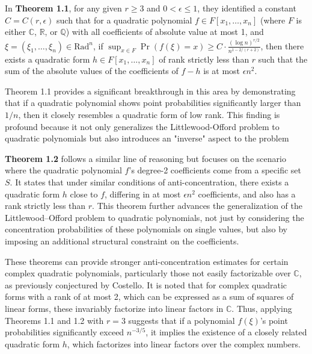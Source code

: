 In \textbf{Theorem 1.1}, for any given $r \geq 3$ and
$0 < \epsilon \leq 1$, they identified a constant
$C = C(r, \epsilon)$ such that for a quadratic polynomial
$f \in F[x_1, \dots, x_n]$ (where $F$ is either 
$\mathbb{C}$, $\mathbb{R}$, or $\mathbb{Q}$) with all coefficients
of absolute value at most 1, and
$\xi = (\xi_1, \dots, \xi_n) \in \text{Rad}^n$, if
${\sup_{x \in F} \Pr(f(\xi) = x) \geq C \cdot \frac{(\log n)^{r/2}}{n^{1-2/(r+2)}}}$,
then there exists a quadratic form
$h \in F[x_1, \dots, x_n]$ of rank strictly less than $r$
such that the sum of the absolute values of the coefficients
of $f - h$ is at most $\epsilon n^2$.
 
Theorem 1.1 provides a significant breakthrough in this 
area by demonstrating that if a quadratic polynomial shows 
point probabilities significantly larger than $1/n$, then
it closely resembles a quadratic form of low rank.
This finding is profound because it not only generalizes
the Littlewood-Offord problem to quadratic polynomials
but also introduces an "inverse" aspect to the problem\\\newline

\textbf{Theorem 1.2} follows a similar line of reasoning but
focuses on the scenario where the quadratic polynomial ${f}$'s 
degree-2 coefficients come from a specific set $S$. 
It states that under similar conditions of anti-concentration,
there exists a quadratic form $h$ close to ${f}$,
differing in at most $\epsilon n^2$ coefficients, 
and also has a rank strictly less than $r$. 
This theorem further advances the generalization of the 
Littlewood–Offord problem to quadratic polynomials,
not just by considering the concentration probabilities
of these polynomials on single values, but also by imposing
an additional structural constraint on the coefficients.\\\newline

These theorems can provide stronger anti-concentration
estimates for certain complex quadratic polynomials,
particularly those not easily factorizable over $\mathbb{C}$,
as previously conjectured by Costello.
It is noted that for complex quadratic forms with a rank
of at most 2, which can be expressed as a sum of squares 
of linear forms, these invariably factorize into linear factors
in $\mathbb{C}$.
Thus, applying Theorems 1.1 and 1.2 with $r = 3$ suggests
that if a polynomial $f(\xi)$'s point probabilities
significantly exceed $n^{-3/5}$, it implies the existence 
of a closely related quadratic form $h$, which factorizes
into linear factors over the complex numbers.\\\newline

